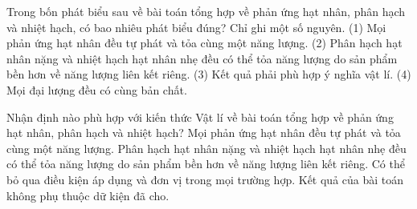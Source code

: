 \begin{ex}
Trong bốn phát biểu sau về bài toán tổng hợp về phản ứng hạt nhân, phân hạch và nhiệt hạch, có bao nhiêu phát biểu đúng? Chỉ ghi một số nguyên. (1) Mọi phản ứng hạt nhân đều tự phát và tỏa cùng một năng lượng. (2) Phân hạch hạt nhân nặng và nhiệt hạch hạt nhân nhẹ đều có thể tỏa năng lượng do sản phẩm bền hơn về năng lượng liên kết riêng. (3) Kết quả phải phù hợp ý nghĩa vật lí. (4) Mọi đại lượng đều có cùng bản chất.
\end{ex}

\begin{ex}
Nhận định nào phù hợp với kiến thức Vật lí về bài toán tổng hợp về phản ứng hạt nhân, phân hạch và nhiệt hạch?
\choice
{Mọi phản ứng hạt nhân đều tự phát và tỏa cùng một năng lượng.}
{\True Phân hạch hạt nhân nặng và nhiệt hạch hạt nhân nhẹ đều có thể tỏa năng lượng do sản phẩm bền hơn về năng lượng liên kết riêng.}
{Có thể bỏ qua điều kiện áp dụng và đơn vị trong mọi trường hợp.}
{Kết quả của bài toán không phụ thuộc dữ kiện đã cho.}
\end{ex}

